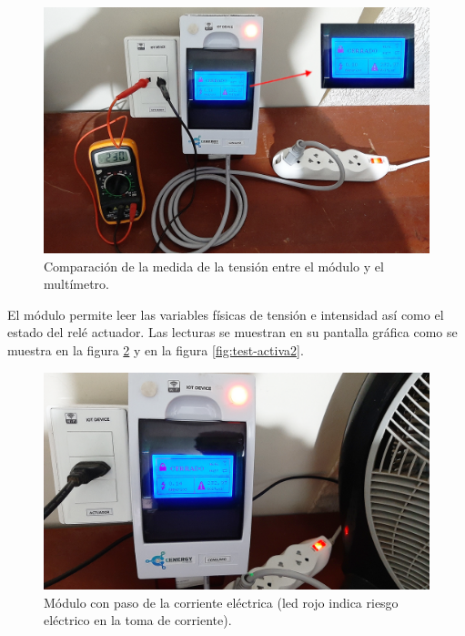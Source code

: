 \begin{figure}[htpb]
\centering 
\includegraphics[width=1.0\textwidth]{./Figures/test/consumo/tension2.png}
\caption{Comparación de la medida de la tensión entre el módulo y el multímetro.}
\label{fig:test-tension}
\end{figure}

El módulo permite leer las variables físicas de tensión e intensidad así como el estado del relé actuador. Las lecturas se muestran en su pantalla gráfica como se muestra en la figura \ref{fig:test-activa1} y en la figura \ref{fig:test-activa2}.
\vspace{0.5cm}
\begin{figure}[htpb]
\centering 
\includegraphics[width=1.0\textwidth]{./Figures/test/consumo/paso.png}
\caption{Módulo con paso de la corriente eléctrica (led rojo indica riesgo eléctrico en la toma de corriente).}
\label{fig:test-activa1}
\end{figure}

